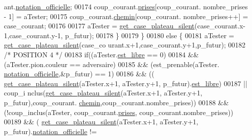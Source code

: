 \begin{DoxyCode}
      ant.\hyperlink{structcase__plateau_ad510581b324604a9cf685cbb769a421a}{notation_officielle};
00174                                                 coup\_courant.\hyperlink{structcoup_ae19b3a66d3f4e66b8f69a38e4005f44a}{prises}[coup\_courant.
      nombre\_prises - 1] = aTester;
00175                                                 coup\_courant.\hyperlink{structcoup_aa66b88eb8140c2f459ac92fad0796510}{chemin}[coup\_courant.
      nombre\_prises++] = case\_courant;
00176 
00177                                                 aTester = 
      \hyperlink{plateau_8h_a60a8f706865d0ae9087f8d65d4667655}{get_case_plateau_silent}(case\_courant.x-1,case\_courant.y-1, p\_futur);
00178                                         \}
00179                                 \}
00180                                 \textcolor{keywordflow}{else} \{
00181                                         aTester = \hyperlink{plateau_8h_a60a8f706865d0ae9087f8d65d4667655}{get_case_plateau_silent}(case\_co
      urant.x+1,case\_courant.y+1,p\_futur);
00182                                         \textcolor{comment}{/* POSITION 4 */}
00183                                         \textcolor{keywordflow}{if}((aTester.\hyperlink{structcase__plateau_a173f25d2fd7c653d77ca8174ba4f636d}{est_libre} == 0)
00184                                                         && (aTester.pion.couleur 
      == adversaire)
00185                                                         && (est\_prenable(aTester.
      \hyperlink{structcase__plateau_ad510581b324604a9cf685cbb769a421a}{notation_officielle},&p\_futur) == 1)
00186                                                         && ((
      \hyperlink{plateau_8h_a60a8f706865d0ae9087f8d65d4667655}{get_case_plateau_silent}(aTester.x+1, aTester.y+1, p\_futur).\hyperlink{structcase__plateau_a173f25d2fd7c653d77ca8174ba4f636d}{est_libre})
00187                                                                         || coup\_i
      nclus(\hyperlink{plateau_8h_a60a8f706865d0ae9087f8d65d4667655}{get_case_plateau_silent}(aTester.x+1, aTester.y+1, p\_futur),coup\_courant.
      \hyperlink{structcoup_aa66b88eb8140c2f459ac92fad0796510}{chemin},coup\_courant.nombre\_prises))
00188                                                         && (!coup\_inclus(aTester,
       coup\_courant.\hyperlink{structcoup_ae19b3a66d3f4e66b8f69a38e4005f44a}{prises}, coup\_courant.nombre\_prises))
00189                                                         && (
      \hyperlink{plateau_8h_a60a8f706865d0ae9087f8d65d4667655}{get_case_plateau_silent}(aTester.x+1, aTester.y+1, p\_futur).\hyperlink{structcase__plateau_ad510581b324604a9cf685cbb769a421a}{notation_officielle} !=

\end{DoxyCode}
